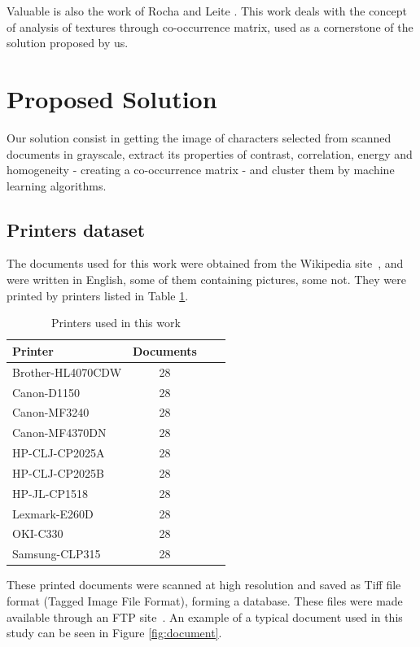 \documentclass[10pt,twocolumn,letterpaper]{article}
\begin{document}
Valuable is also the work of Rocha and Leite \cite{Rocha}. This work deals with the concept of analysis of textures through co-occurrence matrix, used as a cornerstone of the solution proposed by us.

\section{Proposed Solution}
\label{sec:proposed_solution}

Our solution consist in getting the image of characters selected from scanned documents in grayscale, extract its properties of contrast, correlation, energy and homogeneity - creating a co-occurrence matrix - and cluster them by machine learning algorithms.

\subsection{Printers dataset}
\label{subsec:printers_dataset}

The documents used for this work were obtained from the Wikipedia site~\cite{Wikipedia}, and were written in English, some of them containing pictures, some not. They were printed by printers listed in Table \ref{tab:printers}. 

\begin{table}
\label{tab:printers}
\caption{Printers used in this work}
\begin{center}
\begin{tabular}{l*{2}{c}r}
Printer           & Documents \\
\hline
Brother-HL4070CDW & 28 \\
Canon-D1150 & 28 \\
Canon-MF3240 & 28 \\
Canon-MF4370DN & 28 \\
HP-CLJ-CP2025A & 28 \\
HP-CLJ-CP2025B & 28 \\
HP-JL-CP1518 & 28 \\
Lexmark-E260D & 28 \\
OKI-C330 & 28 \\
Samsung-CLP315 & 28 \\
\end{tabular}
\end{center}
\end{table}

These printed documents were scanned at high resolution and saved as Tiff file format (Tagged Image File Format), forming a database. These files were made available through an FTP site~\cite{Printers_dataset}. An example of a typical document used in this study can be seen in Figure \ref{fig:document}.
\end{document}
